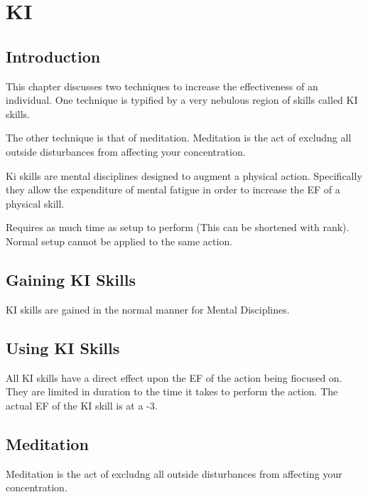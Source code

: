 \chapter{KI}

\section{Introduction}

This chapter discusses two techniques to increase the effectiveness 
of an individual. One technique is typified by a  very nebulous 
region of skills called KI skills. 

The other technique is that of meditation. 
Meditation is the act of excludng all outside disturbances from 
affecting your concentration.  

Ki skills are mental disciplines designed
to augment a physical action. Specifically they allow the expenditure
of mental fatigue in order to increase the EF of a physical skill.  

Requires as much time as setup to perform (This can be shortened with rank).
Normal setup cannot be applied to the same action.

\section{Gaining KI Skills}

KI skills are gained in the normal manner for Mental Disciplines. 

\section{Using KI Skills}

All KI skills have a direct effect upon the EF of the action being 
fiocused on. They are limited in duration to the time it takes to 
perform the action. The actual EF of the KI skill is at a -3. 

\section{Meditation}

Meditation is the act of excludng all outside disturbances from 
affecting your concentration.  


